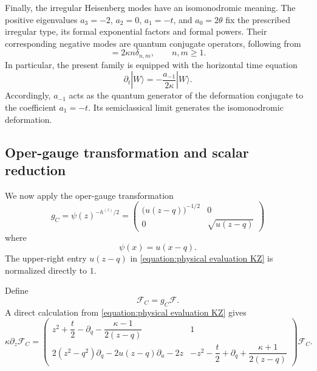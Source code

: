 \documentclass[a4paper,11pt]{article}
\newcommand{\cF}{\mathcal{F}}
\numberwithin{equation}{section}
\begin{document}
Finally, the irregular Heisenberg modes have an isomonodromic meaning.
The positive eigenvalues
$a_{3}=-2$, $a_{2}=0$, $a_{1}=-t$, and $a_{0}=2\theta$
fix the prescribed irregular type, its formal exponential factors and
formal powers.  Their
corresponding negative modes are quantum conjugate operators, following from
\begin{equation}
 [a_{n},a_{-m}]=2\kappa n\delta_{n,m},
 \qquad n,m\geq1.
\end{equation}
In particular, the present family is equipped with the horizontal
time equation
\begin{equation}
\partial_{t}|W\rangle
 =-\frac{a_{-1}}{2\kappa}|W\rangle.
\end{equation}
Accordingly, $a_{-1}$ acts as the quantum generator of the deformation
conjugate to the coefficient $a_{1}=-t$.  Its semiclassical limit generates the isomonodromic deformation.




\subsection{Oper-gauge transformation and scalar reduction}

 We now apply the oper-gauge transformation
\begin{equation}
	\label{equation:oper gauge transformation}
	g_{C}
	=
	\psi(z)^{-h^{(z)}/2}
	=
	\begin{pmatrix}
		\bigl(u(z-q)\bigr)^{-1/2}&0\\
		0&\sqrt{u(z-q)}
	\end{pmatrix}
\end{equation}
where
\begin{equation}
	\psi(x)=u(x-q).
\end{equation}
The upper-right entry $u(z-q)$ in \eqref{equation:physical evaluation KZ} is normalized directly to $1$.

Define
\begin{equation}
	\cF_{C}=g_{C}\cF.
\end{equation}
A direct calculation from \eqref{equation:physical evaluation KZ} gives
\begin{equation}
	\label{equation:oper gauge KZ}
	\kappa\partial_{z}\cF_{C}
	=
	\begin{pmatrix}
		z^{2}+\dfrac{t}{2}-\partial_{q}-\dfrac{\kappa-1}{2(z-q)}
		&
		1
		\\[3mm]
		2(z^{2}-q^{2})\partial_{q}
		-2u(z-q)\partial_{u}
		-2z
		&
		-z^{2}-\dfrac{t}{2}+\partial_{q}+\dfrac{\kappa+1}{2(z-q)}
	\end{pmatrix}
	\cF_{C}.
\end{equation}
\end{document}
